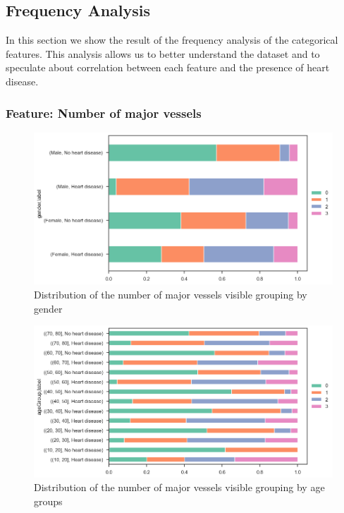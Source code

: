 \subsection{Frequency Analysis}

In this section we show the result of the frequency analysis of the categorical features. This analysis allows us to
better understand the dataset and to speculate about correlation between each feature and the presence of
heart disease.

\subsubsection{Feature: Number of major vessels}

\begin{figure}
    \caption{Distribution of the number of major vessels visible grouping by gender}\label{frequency-vessel-gender-percent}
    \centering
    \includegraphics[width=\linewidth]{media/frequency-01-gender-vessels.png}
\end{figure}

\begin{figure}
    \caption{Distribution of the number of major vessels visible grouping by age groups}\label{frequency-vessel-age-percent}
    \centering
    \includegraphics[width=\linewidth]{media/frequency-02-agegroup-vessels.png}
\end{figure}

